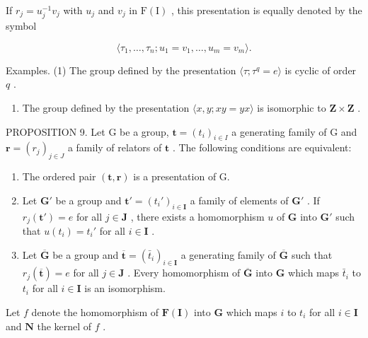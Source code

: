 If \(r_j = u_j^{-1}v_j\) with \(u_j\) and \(v_j\) in \(\mathrm{F(I)}\) , this presentation is equally denoted by the symbol

\[
\langle \tau_ {1}, \dots , \tau_ {n}; u _ {1} = v _ {1}, \dots , u _ {m} = v _ {m} \rangle .
\]

Examples. (1) The group defined by the presentation \(\langle \tau; \tau^q = e \rangle\) is cyclic of order \(q\) .

\begin{enumerate}
\def\labelenumi{(\arabic{enumi})}
\setcounter{enumi}{1}
\tightlist
\item
  The group defined by the presentation \(\langle x, y; xy = yx \rangle\) is isomorphic to \(\mathbf{Z} \times \mathbf{Z}\) .
\end{enumerate}

PROPOSITION 9. Let G be a group, \(\mathbf{t} = (t_i)_{i \in I}\) a generating family of G and \(\mathbf{r} = (r_j)_{j \in J}\) a family of relators of \(\mathbf{t}\) . The following conditions are equivalent:

\begin{enumerate}
\def\labelenumi{(\alph{enumi})}
\item
  The ordered pair \((\mathbf{t},\mathbf{r})\) is a presentation of G.
\item
  Let \(\mathbf{G}'\) be a group and \(\mathbf{t}' = (t_i')_{i \in \mathbf{I}}\) a family of elements of \(\mathbf{G}'\) . If \(r_j(\mathbf{t}') = e\) for all \(j \in \mathbf{J}\) , there exists a homomorphism \(u\) of \(\mathbf{G}\) into \(\mathbf{G}'\) such that \(u(t_i) = t_i'\) for all \(i \in \mathbf{I}\) .
\item
  Let \(\overline{\mathbf{G}}\) be a group and \(\overline{\mathbf{t}} = (\bar{t}_i)_{i\in \mathbf{I}}\) a generating family of \(\overline{\mathbf{G}}\) such that \(r_j(\overline{\mathbf{t}}) = e\) for all \(j\in \mathbf{J}\) . Every homomorphism of \(\overline{\mathbf{G}}\) into \(\mathbf{G}\) which maps \(\bar{t}_i\) to \(t_i\) for all \(i\in \mathbf{I}\) is an isomorphism.
\end{enumerate}

Let \(f\) denote the homomorphism of \(\mathbf{F}(\mathbf{I})\) into \(\mathbf{G}\) which maps \(i\) to \(t_i\) for all \(i \in \mathbf{I}\) and \(\mathbf{N}\) the kernel of \(f\) .

